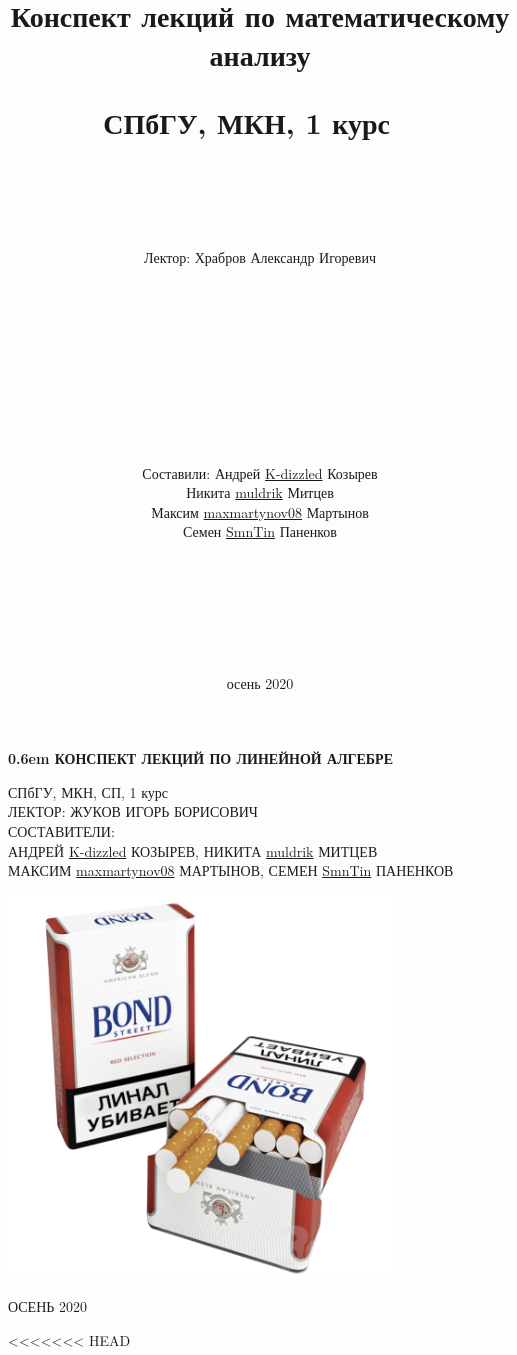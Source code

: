 \documentclass[12pt,letterpaper]{report}
\title{Конспект лекций по математическому анализу

СПбГУ, МКН, 1 курс
\ \\
\ \\ \ \\
}
\author{Лектор: Храбров Александр Игоревич \\
\ \\ \ \\ \ \\ \ \\ \ \\ \ \\ \ \\ \ \\
\ \\ 
\begin{flushright}
Составили: Андрей \href{https://github.com/K-dizzled}{K-dizzled} Козырев \\ Никита  \href{https://github.com/muldrik}{muldrik} Митцев \\ Максим \href{https://github.com/maxmartynov08}{maxmartynov08} Мартынов \\ Семен \href{https://github.com/SmnTin}{SmnTin} Паненков
\end{flushright}
\ \\
\ \\
\ \\
\ \\
\ \\
\ \\}
\date{осень 2020}
\theoremstyle{definition}
\begin{document}
\clearpage
\newcommand\nbvspace[1][3]{\vspace*{\stretch{#1}}}
\newcommand\nbstretchyspace{\spaceskip0.5em plus 0.25em minus 0.25em}
\newcommand{\nbtitlestretch}{\spaceskip0.6em}
\pagestyle{empty}
\begin{center}
\bfseries
\nbvspace[1]
\Huge
{\nbtitlestretch\huge
КОНСПЕКТ ЛЕКЦИЙ ПО ЛИНЕЙНОЙ АЛГЕБРЕ}

\nbvspace[1]
\normalsize

СПбГУ, МКН, СП, 1 курс\\
ЛЕКТОР: ЖУКОВ ИГОРЬ БОРИСОВИЧ
\nbvspace[1]
\\
\Large СОСТАВИТЕЛИ:\\[0.5em]
\footnotesize АНДРЕЙ \href{https://github.com/K-dizzled}{K-dizzled} КОЗЫРЕВ, НИКИТА  \href{https://github.com/muldrik}{muldrik} МИТЦЕВ \\ МАКСИМ \href{https://github.com/maxmartynov08}{maxmartynov08} МАРТЫНОВ, СЕМЕН \href{https://github.com/SmnTin}{SmnTin} ПАНЕНКОВ

\nbvspace[2]

\includegraphics[width=4.0in]{./images/linal_kills.png}
\nbvspace[3]
\normalsize

\large
ОСЕНЬ 2020
\nbvspace[1]
\end{center}
\newpage
\pagestyle{plain}
\fi
\tableofcontents
\newpage
<<<<<<< HEAD
\end{document}
